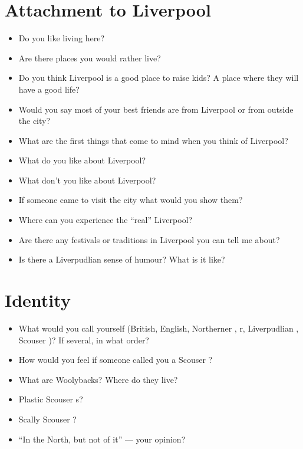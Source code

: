 	\section*{Attachment to Liverpool}
	\begin{multicols}{2}
		\begin{itemize}
			\item Do you like living here?
			\item Are there places you would rather live?
			\item Do you think Liverpool is a good place to raise kids? A place where they will have a good life?
			\item Would you say most of your best friends are from Liverpool or from outside the city?
			\item What are the first things that come to mind when you think of Liverpool?
			\item What do you like about Liverpool?
			\item What don't you like about Liverpool?
			\item If someone came to visit the city what would you show them?
			\item Where can you experience the \enquote{real} Liverpool?
			\item Are there any festivals or traditions in Liverpool you can tell me about?
			\item Is there a Liverpudlian  sense of humour? What is it like?
		\end{itemize}
	\end{multicols}
	
	\section*{Identity}
	\begin{multicols}{2}
		\begin{itemize}
			\item What would you call yourself (British, English, Northerner , r, Liverpudlian , Scouser )? If several, in what order?
			\item How would you feel if someone called you a Scouser ?
			\item What are Woolybacks? Where do they live?
			\item Plastic Scouser s?
			\item Scally Scouser ?
			\item ``In the North, but not of it'' --- your opinion?
		\end{itemize}
	\end{multicols}
	
